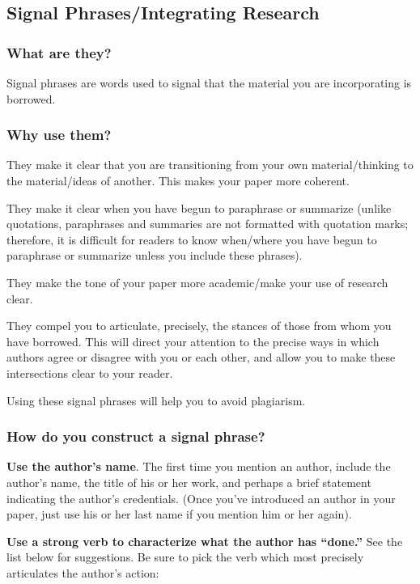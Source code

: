 \subsection{Signal Phrases/Integrating Research}
 
 
\subsubsection{What are they?}
 
Signal phrases are words used to signal that the material you are incorporating is borrowed.
 
\subsubsection {Why use them?}
 
They make it clear that you are transitioning from your own material/thinking to the material/ideas of another. This makes your paper more coherent.
 
They make it clear when you have begun to paraphrase or summarize (unlike quotations, paraphrases and summaries are not formatted with quotation marks; therefore, it is difficult for readers to know when/where you have begun to paraphrase or summarize unless you include these phrases).
 
They make the tone of your paper more academic/make your use of research clear.
 
They compel you to articulate, precisely, the stances of those from whom you have borrowed. This will direct your attention to the precise ways in which authors agree or disagree with you or each other, and allow you to make these intersections clear to your reader.
 
Using these signal phrases will help you to avoid plagiarism.
 
 
\subsubsection{How do you construct a signal phrase?}
 
\textbf{Use the author's name}. The first time you mention an author, include the author's name, the title of his or her work, and perhaps a brief statement indicating the author's credentials. (Once you've introduced an author in your paper, just use his or her last name if you mention him or her again).

\textbf{Use a strong verb to characterize what the author has “done.”} See the list below for suggestions. Be sure to pick the verb which most precisely articulates the author's action:
 
